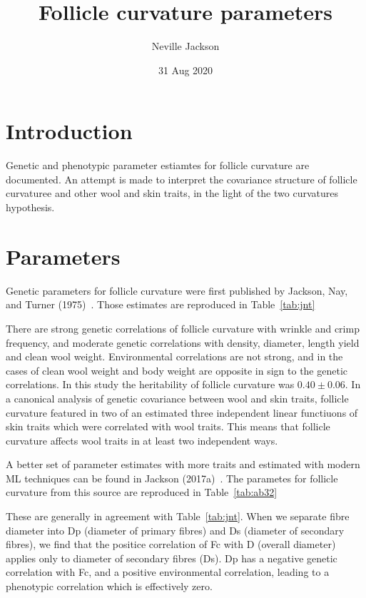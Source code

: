 \documentclass{article}
\begin{document}
\title{Follicle curvature parameters}
\author{Neville Jackson}
\date{31 Aug 2020}

\maketitle



\section{Introduction}
Genetic and phenotypic parameter estiamtes for follicle curvature are documented. An attempt is made to interpret the covariance structure of follicle curvaturee and other wool and skin traits, in the light of the two curvatures hypothesis.

\section{Parameters}
Genetic parameters for follicle curvature were first published by Jackson, Nay, and Turner (1975)~\cite{jackson-1975}. Those estimates are reproduced in Table~\ref{tab:jnt}

There are strong genetic correlations of follicle curvature with wrinkle and crimp frequency, and moderate genetic correlations with density, diameter, length yield and clean wool weight.  Environmental correlations are not strong, and in the cases of clean wool weight and body weight are opposite in sign to the genetic correlations.
In this study the heritability of follicle curvature was $0.40 \pm 0.06$.
In a canonical analysis of genetic covariance between wool and skin traits, follicle curvature featured in two of an estimated three independent linear functiuons of skin traits which were correlated with wool traits. This means that follicle curvature affects wool traits in at least two independent ways. 

A better set of parameter estimates with more traits and estimated with modern ML techniques can be found in Jackson (2017a)~\cite{jackson-2017a}. The parametes for follicle curvature from this source are  reproduced in Table~\ref{tab:ab32}

These are generally in agreement with Table~\ref{tab:jnt}. When we separate fibre diameter into Dp (diameter of primary fibres) and Ds (diameter of secondary fibres), we find that the positice correlation of Fc with D (overall diameter) applies only to diameter of secondary fibres (Ds). Dp has a negative genetic correlation with Fc, and a positive environmental correlation, leading to a phenotypic correlation which is effectively zero. 
\end{document}
